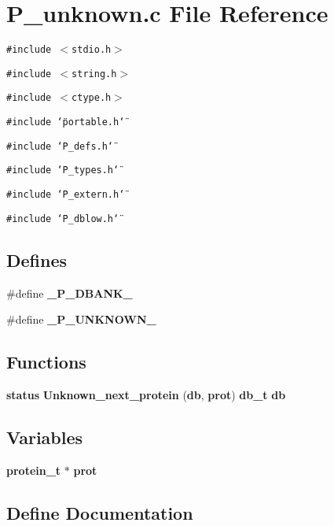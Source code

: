 \section{P\_\-unknown.c File Reference}
\label{P__unknown_8c}
{\tt \#include $<$stdio.h$>$}\par
{\tt \#include $<$string.h$>$}\par
{\tt \#include $<$ctype.h$>$}\par
{\tt \#include \char`\"{}portable.h\char`\"{}}\par
{\tt \#include \char`\"{}P\_\-defs.h\char`\"{}}\par
{\tt \#include \char`\"{}P\_\-types.h\char`\"{}}\par
{\tt \#include \char`\"{}P\_\-extern.h\char`\"{}}\par
{\tt \#include \char`\"{}P\_\-dblow.h\char`\"{}}\par
\subsection*{Defines}
\begin{CompactItemize}
\item 
\#define {\bf \_\-P\_\-DBANK\_\-}
\item 
\#define {\bf \_\-P\_\-UNKNOWN\_\-}
\end{CompactItemize}
\subsection*{Functions}
\begin{CompactItemize}
\item 
{\bf status} {\bf Unknown\_\-next\_\-protein} ({\bf db}, {\bf prot}) {\bf db\_\-t} {\bf db}
\end{CompactItemize}
\subsection*{Variables}
\begin{CompactItemize}
\item 
{\bf protein\_\-t} $\ast$ {\bf prot}
\end{CompactItemize}


\subsection{Define Documentation}
